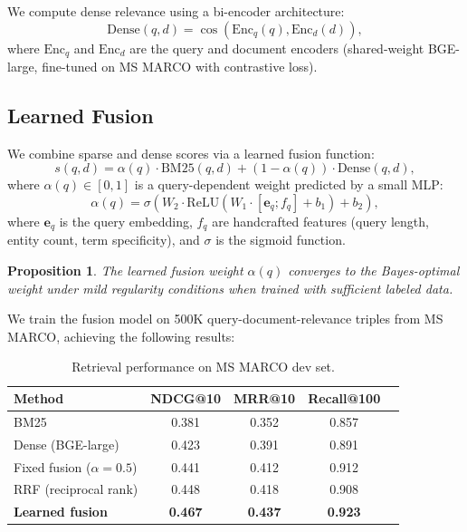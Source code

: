 \documentclass[11pt,twocolumn]{article}
\newtheorem{proposition}[theorem]{Proposition}
\begin{document}
We compute dense relevance using a bi-encoder architecture:
\begin{equation}
\text{Dense}(q, d) = \cos(\text{Enc}_q(q), \text{Enc}_d(d)),
\end{equation}
where $\text{Enc}_q$ and $\text{Enc}_d$ are the query and document encoders (shared-weight BGE-large, fine-tuned on MS MARCO with contrastive loss).

\subsection{Learned Fusion}

We combine sparse and dense scores via a learned fusion function:
\begin{equation}
s(q, d) = \alpha(q) \cdot \text{BM25}(q, d) + (1 - \alpha(q)) \cdot \text{Dense}(q, d),
\end{equation}
where $\alpha(q) \in [0, 1]$ is a query-dependent weight predicted by a small MLP:
\begin{equation}
\alpha(q) = \sigma(W_2 \cdot \text{ReLU}(W_1 \cdot [\bm{e}_q; f_q] + b_1) + b_2),
\end{equation}
where $\bm{e}_q$ is the query embedding, $f_q$ are handcrafted features (query length, entity count, term specificity), and $\sigma$ is the sigmoid function.

\begin{proposition}
The learned fusion weight $\alpha(q)$ converges to the Bayes-optimal weight under mild regularity conditions when trained with sufficient labeled data.
\end{proposition}

We train the fusion model on 500K query-document-relevance triples from MS MARCO, achieving the following results:

\begin{table}[H]
\centering
\small
\begin{tabular}{lcccc}
\toprule
\textbf{Method} & \textbf{NDCG@10} & \textbf{MRR@10} & \textbf{Recall@100} \\
\midrule
BM25 & 0.381 & 0.352 & 0.857 \\
Dense (BGE-large) & 0.423 & 0.391 & 0.891 \\
Fixed fusion ($\alpha = 0.5$) & 0.441 & 0.412 & 0.912 \\
RRF (reciprocal rank) & 0.448 & 0.418 & 0.908 \\
\textbf{Learned fusion} & \textbf{0.467} & \textbf{0.437} & \textbf{0.923} \\
\bottomrule
\end{tabular}
\caption{Retrieval performance on MS MARCO dev set.}
\label{tab:retrieval}
\end{table}
\end{document}
